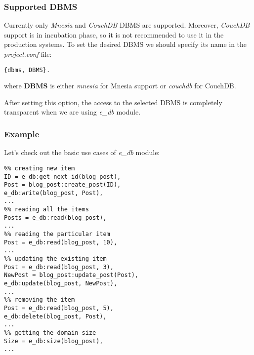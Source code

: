 \subsubsection{Supported DBMS}
Currently only {\it Mnesia} and {\it CouchDB} DBMS are supported. Moreover, {\it CouchDB} support is in incubation phase, so it is not recommended to use it in the production systems. To set the desired DBMS we should specify its name in the {\it project.conf} file:
\begin{verbatim}
{dbms, DBMS}.
\end{verbatim}
where {\bf DBMS} is either {\it mnesia} for Mnesia support or {\it couchdb} for CouchDB. 

After setting this option, the access to the selected DBMS is completely transparent when we are using {\it e\_db} module.

\subsubsection{Example}
Let's check out the basic use cases of {\it e\_db} module:
\begin{verbatim}
%% creating new item
ID = e_db:get_next_id(blog_post),
Post = blog_post:create_post(ID),
e_db:write(blog_post, Post),
...
%% reading all the items
Posts = e_db:read(blog_post),
...
%% reading the particular item
Post = e_db:read(blog_post, 10),
...
%% updating the existing item
Post = e_db:read(blog_post, 3),
NewPost = blog_post:update_post(Post),
e_db:update(blog_post, NewPost),
...
%% removing the item
Post = e_db:read(blog_post, 5),
e_db:delete(blog_post, Post),
...
%% getting the domain size
Size = e_db:size(blog_post),
...
\end{verbatim}
